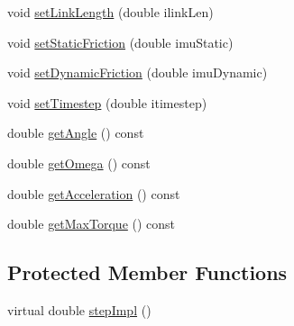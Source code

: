 \begin{DoxyCompactItemize}
\item 
void \mbox{\hyperlink{classokapi_1_1FlywheelSimulator_a54ebeed8e7eefd19b0d476a3215b18e7}{set\+Link\+Length}} (double ilink\+Len)
\item 
void \mbox{\hyperlink{classokapi_1_1FlywheelSimulator_a60d44d13592af17e4490245868e8db5a}{set\+Static\+Friction}} (double imu\+Static)
\item 
void \mbox{\hyperlink{classokapi_1_1FlywheelSimulator_abc346f1446a476dc0c3571deabc79581}{set\+Dynamic\+Friction}} (double imu\+Dynamic)
\item 
void \mbox{\hyperlink{classokapi_1_1FlywheelSimulator_aba93a3606887d59536c47b0a1b1c6c6e}{set\+Timestep}} (double itimestep)
\item 
double \mbox{\hyperlink{classokapi_1_1FlywheelSimulator_a506f126c88bf66759d2d31844b7f50e6}{get\+Angle}} () const
\item 
double \mbox{\hyperlink{classokapi_1_1FlywheelSimulator_a27636d62f018187f5858f2244d2b3f82}{get\+Omega}} () const
\item 
double \mbox{\hyperlink{classokapi_1_1FlywheelSimulator_af7ce5da6fcafa314cb2372d6e6a98e28}{get\+Acceleration}} () const
\item 
double \mbox{\hyperlink{classokapi_1_1FlywheelSimulator_a028341fbfce013426a70fe74a7b0b584}{get\+Max\+Torque}} () const
\end{DoxyCompactItemize}
\subsection*{Protected Member Functions}
\begin{DoxyCompactItemize}
\item 
virtual double \mbox{\hyperlink{classokapi_1_1FlywheelSimulator_a7c80a5627ca600a79b1e1300e6922ba4}{step\+Impl}} ()
\end{DoxyCompactItemize}
